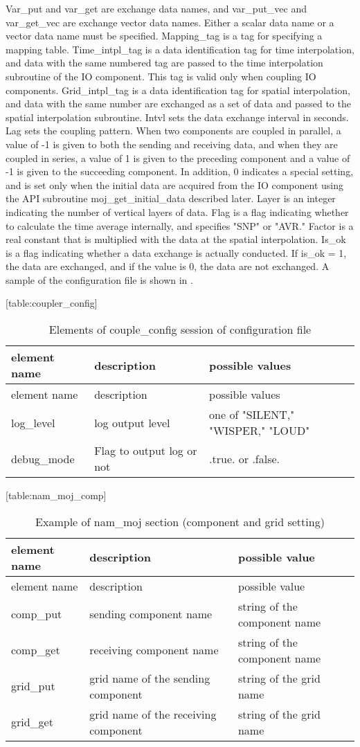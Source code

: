 Var\_put and var\_get are exchange data names, and var\_put\_vec and
var\_get\_vec are exchange vector data names. Either a scalar data name
or a vector data name must be specified. Mapping\_tag is a tag for
specifying a mapping table. Time\_intpl\_tag is a data identification
tag for time interpolation, and data with the same numbered tag are
passed to the time interpolation subroutine of the IO component. This
tag is valid only when coupling IO components. Grid\_intpl\_tag is a
data identification tag for spatial interpolation, and data with the
same number are exchanged as a set of data and passed to the spatial
interpolation subroutine. Intvl sets the data exchange interval in
seconds. Lag sets the coupling pattern. When two components are coupled
in parallel, a value of -1 is given to both the sending and receiving
data, and when they are coupled in series, a value of 1 is given to the
preceding component and a value of -1 is given to the succeeding
component. In addition, 0 indicates a special setting, and is set only
when the initial data are acquired from the IO component using the API
subroutine moj\_get\_initial\_data described later. Layer is an integer
indicating the number of vertical layers of data. Flag is a flag
indicating whether to calculate the time average internally, and
specifies "SNP" or "AVR." Factor is a real constant that is multiplied
with the data at the spatial interpolation. Is\_ok is a flag indicating
whether a data exchange is actually conducted. If is\_ok = 1, the data
are exchanged, and if the value is 0, the data are not exchanged. A
sample of the configuration file is shown in .

\protect\hypertarget{table:coupler_config}{}{{[}table:coupler\_config{]}}

\hypertarget{table:coupler_config}{}
\begin{longtable}[]{@{}lll@{}}
\caption{Elements of couple\_config session of configuration
file}\tabularnewline
\toprule
element name & description　 & possible values\tabularnewline
\midrule
\endfirsthead
\toprule
element name & description　 & possible values\tabularnewline
\midrule
\endhead
log\_level & log output level & one of "SILENT," "WISPER,"
"LOUD"\tabularnewline
debug\_mode & Flag to output log or not & .true. or
.false.\tabularnewline
\bottomrule
\end{longtable}

\protect\hypertarget{table:nam_moj_comp}{}{{[}table:nam\_moj\_comp{]}}

\hypertarget{table:nam_moj_comp}{}
\begin{longtable}[]{@{}lll@{}}
\caption{Example of nam\_moj section (component and grid
setting)}\tabularnewline
\toprule
element name & description & possible value\tabularnewline
\midrule
\endfirsthead
\toprule
element name & description & possible value\tabularnewline
\midrule
\endhead
comp\_put & sending component name & string of the component
name\tabularnewline
comp\_get & receiving component name & string of the component
name\tabularnewline
grid\_put & grid name of the sending component & string of the grid
name\tabularnewline
grid\_get & grid name of the receiving component & string of the grid
name\tabularnewline
\bottomrule
\end{longtable}

